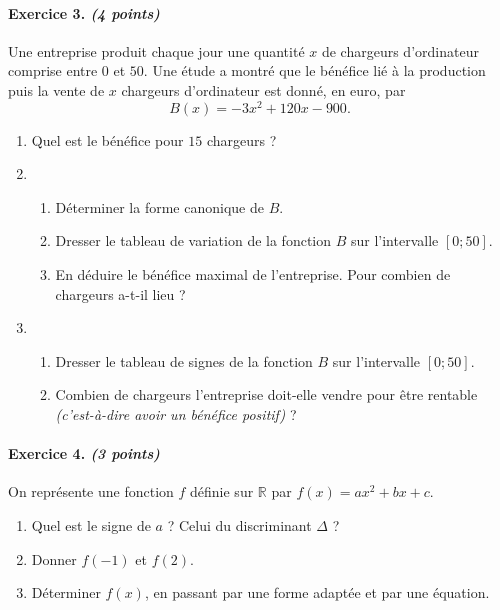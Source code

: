 \documentclass[11pt]{article}
\begin{document}
\paragraph{Exercice 3. \emph{(4 points)}} Une entreprise produit chaque jour une quantité $x$ de
chargeurs d'ordinateur comprise entre $0$ et $50$. Une étude a montré que le
bénéfice lié à la production puis la vente de $x$ chargeurs d'ordinateur est donné, en euro, par
\[
  B(x) = -3x^2+120x-900.
\]
\begin{enumerate}
  \item Quel est le bénéfice pour $15$ chargeurs ?
  \item \begin{enumerate}
      \item Déterminer la forme canonique de $B$.
      \item Dresser le tableau de variation de la fonction $B$ sur l'intervalle
        $\left[ 0; 50 \right]$.
      \item En déduire le bénéfice maximal de l'entreprise. Pour combien de
        chargeurs a-t-il lieu ?
    \end{enumerate}
  \item \begin{enumerate}
      \item Dresser le tableau de signes de la fonction $B$ sur l'intervalle $\left[
    0;50 \right]$.
  \item Combien de chargeurs l'entreprise doit-elle vendre pour être rentable
    \emph{(c'est-à-dire avoir un bénéfice positif)} ?
    \end{enumerate}

\end{enumerate}




\paragraph{Exercice 4. \emph{(3 points)}}
On représente une fonction $f$ définie sur $\mathbb{R}$ par $f(x)=ax^2+bx+c$.
\begin{center}
\end{center}
\begin{enumerate}
  \item Quel est le signe de $a$ ? Celui du discriminant $\Delta$ ?
  \item Donner $f(-1)$ et $f(2)$.
  \item Déterminer $f(x)$, en passant par une forme adaptée et par une équation.
\end{enumerate}
\end{document}
